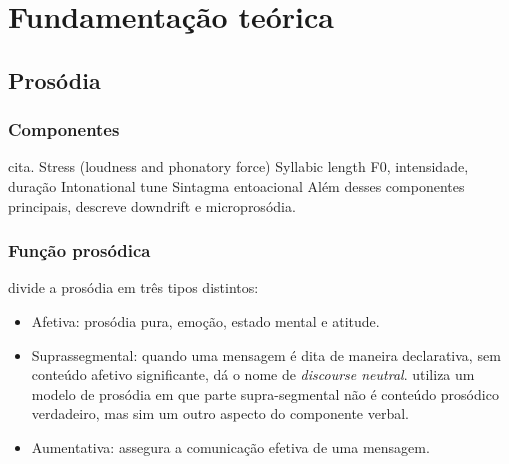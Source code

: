 
\chapter{Fundamentação teórica}

\section{Prosódia}
\subsection{Componentes}
\cite[p.~150]{cagliari} cita.
Stress (loudness and phonatory force)
Syllabic length
F0, intensidade, duração
Intonational tune
Sintagma entoacional
Além desses componentes principais,  descreve downdrift e microprosódia.
\subsection{Função prosódica}
 divide a prosódia em três tipos distintos:

\begin{itemize}
\item Afetiva: prosódia pura, emoção, estado mental e atitude. 
\item Suprassegmental: quando uma mensagem é dita de maneira declarativa, sem conteúdo
afetivo significante, dá o nome de \emph{discourse neutral}. utiliza um modelo
de prosódia em que parte supra-segmental não é conteúdo prosódico verdadeiro,
mas sim um outro aspecto do componente verbal.
\item Aumentativa: assegura a comunicação efetiva de uma
mensagem.
\end{itemize}


